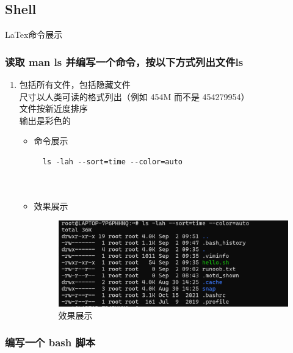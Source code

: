 \documentclass[UTF8]{ctexart}
\begin{document}
  \subsection{Shell}
  {\color{blue}LaTex命令展示}



\subsubsection{读取 man ls 并编写一个命令，按以下方式列出文件ls}

\begin{enumerate}
  \item 包括所有文件，包括隐藏文件\\
尺寸以人类可读的格式列出（例如 454M 而不是 454279954）\\
文件按新近度排序\\
输出是彩色的
  \begin{itemize}
  \item 命令展示
  \begin{verbatim}
  ls -lah --sort=time --color=auto

    
  \end{verbatim}

  \item 效果展示
  \begin{figure}[H]
    \centering
    \includegraphics[width=\textwidth]{1} %
    \caption{效果展示}
  
  \end{figure}
\end{itemize}
\end{enumerate}
\subsubsection{ 编写一个 bash 脚本}
\end{document}
